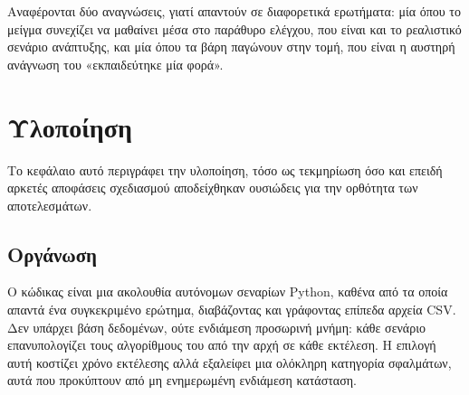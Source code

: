 \documentclass[12pt,a4paper,oneside]{report}
\renewcommand{\_}{\oldunderscore\allowbreak}
\theoremstyle{definition}
\theoremstyle{plain}
\theoremstyle{remark}
\begin{document}
Αναφέρονται δύο αναγνώσεις, γιατί απαντούν σε διαφορετικά ερωτήματα: μία όπου το μείγμα
συνεχίζει να μαθαίνει μέσα στο παράθυρο ελέγχου, που είναι και το ρεαλιστικό σενάριο
ανάπτυξης, και μία όπου τα βάρη παγώνουν στην τομή, που είναι η αυστηρή ανάγνωση του
«εκπαιδεύτηκε μία φορά».

\chapter{Υλοποίηση}
\label{ch:impl}

Το κεφάλαιο αυτό περιγράφει την υλοποίηση, τόσο ως τεκμηρίωση όσο και επειδή αρκετές
αποφάσεις σχεδιασμού αποδείχθηκαν ουσιώδεις για την ορθότητα των αποτελεσμάτων.

\section{Οργάνωση}

Ο κώδικας είναι μια ακολουθία αυτόνομων σεναρίων Python, καθένα από τα οποία απαντά ένα
συγκεκριμένο ερώτημα, διαβάζοντας και γράφοντας επίπεδα αρχεία CSV. Δεν υπάρχει βάση
δεδομένων, ούτε ενδιάμεση προσωρινή μνήμη: κάθε σενάριο επανυπολογίζει τους αλγορίθμους του
από την αρχή σε κάθε εκτέλεση. Η επιλογή αυτή κοστίζει χρόνο εκτέλεσης αλλά εξαλείφει μια
ολόκληρη κατηγορία σφαλμάτων, αυτά που προκύπτουν από μη ενημερωμένη ενδιάμεση κατάσταση.
\end{document}
